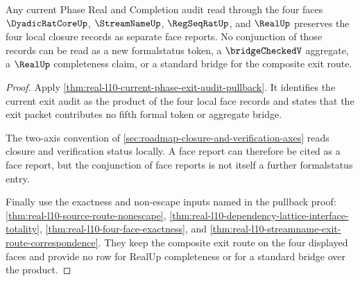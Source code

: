 \begin{theorem}
\label{thm:real-l10-face-status-noncollapse}
Any current Phase Real and Completion audit read through the four faces
$\DyadicRatCoreUp$, $\StreamNameUp$, $\RegSeqRatUp$, and $\RealUp$ preserves
the four local closure records as separate face reports. No conjunction of
those records can be read as a new formalstatus token, a $\bridgeCheckedV$
aggregate, a $\RealUp$ completeness claim, or a standard bridge for the
composite exit route.
\end{theorem}
\begin{proof}
Apply \autoref{thm:real-l10-current-phase-exit-audit-pullback}. It identifies
the current exit audit as the product of the four local face records and
states that the exit packet contributes no fifth formal token or aggregate
bridge.

The two-axis convention of
\autoref{sec:roadmap-closure-and-verification-axes} reads closure and
verification status locally. A face report can therefore be cited as a face
report, but the conjunction of face reports is not itself a further
formalstatus entry.

Finally use the exactness and non-escape inputs named in the pullback proof:
\autoref{thm:real-l10-source-route-nonescape},
\autoref{thm:real-l10-dependency-lattice-interface-totality},
\autoref{thm:real-l10-four-face-exactness}, and
\autoref{thm:real-l10-streamname-exit-route-correspondence}. They keep the
composite exit route on the four displayed faces and provide no row for
RealUp completeness or for a standard bridge over the product.
\end{proof}

